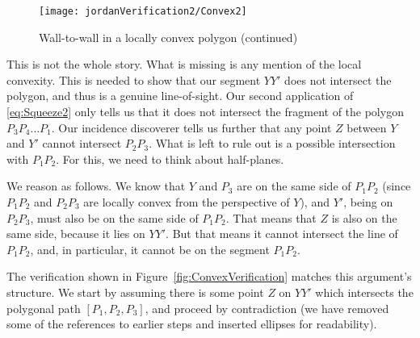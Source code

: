 \begin{figure}
\centering\texttt{[image: jordanVerification2/Convex2]}
\caption{Wall-to-wall in a locally convex polygon (continued)}
\label{fig:Convex2}
\end{figure}

This is not the whole story. What is missing is any mention of the local convexity. This is needed to show that our segment $YY'$ does not intersect the polygon, and thus is a genuine line-of-sight. Our second application of \eqref{eq:Squeeze2} only tells us that it does not intersect the fragment of the polygon $P_3P_4\ldots P_1$. Our incidence discoverer tells us further that any point $Z$ between $Y$ and $Y'$ cannot intersect $P_2P_3$. What is left to rule out is a possible intersection with $P_1P_2$. For this, we need to think about half-planes. 

We reason as follows. We know that $Y$ and $P_3$ are on the same side of $P_1P_2$ (since $P_1P_2$ and $P_2P_3$ are locally convex from the perspective of $Y$), and $Y'$, being on $P_2P_3$, must also be on the same side of $P_1P_2$. That means that $Z$ is also on the same side, because it lies on $YY'$. But that means it cannot intersect the line of $P_1P_2$, and, in particular, it cannot be on the segment $P_1P_2$.

The verification shown in Figure~\ref{fig:ConvexVerification} matches this argument's structure.  We start by assuming there is some point $Z$ on $YY'$ which intersects the polygonal path $[P_1,P_2,P_3]$, and proceed by contradiction (we have removed some of the references to earlier steps and inserted ellipses for readability). 

